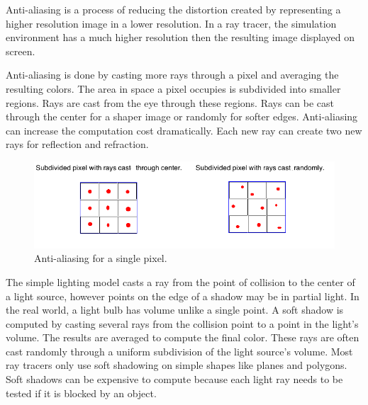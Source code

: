 Anti-aliasing is a process of reducing the distortion created by representing a higher resolution image in a lower resolution.  In a ray tracer, the simulation environment has a much higher resolution then the resulting image displayed on screen. 

Anti-aliasing is done by casting more rays through a pixel and averaging the resulting colors.  The area in space a pixel occupies is subdivided into smaller regions.  Rays are cast from the eye through these regions.  Rays can be cast through the center for a shaper image or randomly for softer edges.  Anti-aliasing can increase the computation cost dramatically.  Each new ray can create two new rays for reflection and refraction.

\begin{figure}[H]
\includegraphics[scale=0.6]{aa.png} 
\caption{Anti-aliasing for a single pixel.}
\label{aa}
\end{figure}

 The simple lighting model casts a ray from the point of collision to the center of a light source, however points on the edge of a shadow may be in partial light.  In the real world, a light bulb has volume unlike a single point.  A soft shadow is computed by casting several rays from the collision point to a point in the light's volume. The results are averaged to compute the final color.  These rays are often cast randomly through a uniform subdivision of the light source's volume.  Most ray tracers only use soft shadowing on simple shapes like planes and polygons.  Soft shadows can be expensive to compute because each light ray needs to be tested if it is blocked by an object.

